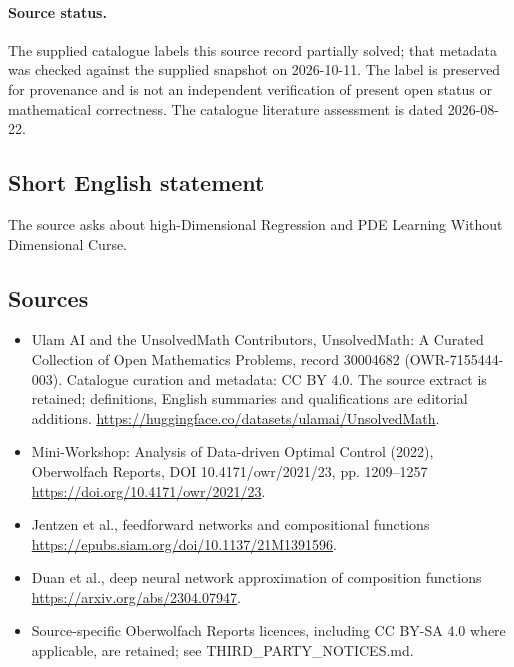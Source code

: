 \documentclass[11pt]{article}
\begin{document}
\paragraph{Source status.}
The supplied catalogue labels this source record partially solved; that metadata was checked against the supplied snapshot on 2026-10-11. The label is preserved for provenance and is not an independent verification of present open status or mathematical correctness. The catalogue literature assessment is dated 2026-08-22.
\subsection{Short English statement}
The source asks about high-Dimensional Regression and PDE Learning Without Dimensional Curse.
\subsection{Sources}
\begin{itemize}
\item[\hypertarget{source:30004682:1}{S1}] Ulam AI and the UnsolvedMath Contributors, UnsolvedMath: A Curated Collection of Open Mathematics Problems, record 30004682 (OWR-7155444-003). Catalogue curation and metadata: CC BY 4.0. The source extract is retained; definitions, English summaries and qualifications are editorial additions.
\url{https://huggingface.co/datasets/ulamai/UnsolvedMath}.
\item[\hypertarget{source:30004682:2}{S2}] Mini-Workshop: Analysis of Data-driven Optimal Control (2022), Oberwolfach Reports, DOI 10.4171/owr/2021/23, pp. 1209--1257
\url{https://doi.org/10.4171/owr/2021/23}.
\item[\hypertarget{source:30004682:3}{S3}] Jentzen et al., feedforward networks and compositional functions
\url{https://epubs.siam.org/doi/10.1137/21M1391596}.
\item[\hypertarget{source:30004682:4}{S4}] Duan et al., deep neural network approximation of composition functions
\url{https://arxiv.org/abs/2304.07947}.
\item Source-specific Oberwolfach Reports licences, including CC BY-SA 4.0 where applicable, are retained; see THIRD\_PARTY\_NOTICES.md.
\end{itemize}
\end{document}
